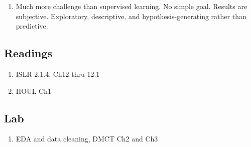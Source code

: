 \documentclass{article}
\begin{document}
\begin{enumerate}
\begin{enumerate}
\begin{itemize}
\item Are there distinct groups of genres or continuous flow?
\item Goal is to make data more intelligible.
\end{itemize} 
\item Credit card fraud: Anomaly detection
\begin{itemize}
\item Each data point is a transaction (amount, time, source, location, recent freq, device).
\item Millions of these per day, tiny amount are fraud.
\item False positive is a problem.
\item Does this deviate from expected? Normal behavior is dense regions, but some deviance can naturally occur.
\item Distance metric determines deviation from normal.
\item Per customer (card?) normalization. 
\item Action may be to identify fraud patterns to catch more.
\end{itemize}
\end{enumerate}

\item Much more challenge than supervised learning. No simple goal. Results are subjective. Exploratory, descriptive, and hypothesis-generating rather than predictive.
\end{enumerate}

\subsection*{Readings}

\begin{enumerate}
\item ISLR 2.1.4, Ch12 thru 12.1
\item HOUL Ch1
\end{enumerate}

\subsection*{Lab}

\begin{enumerate}
\item EDA and data cleaning, DMCT Ch2 and Ch3
\end{enumerate}
\end{document}
